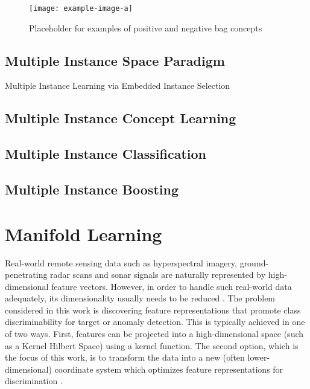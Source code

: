 \begin{center}
	\begin{figure*}[h]
		\centering
		\texttt{[image: example-image-a]}
		\caption[Multiple instance learning bags.]{Placeholder for examples of positive and negative bag concepts}
		\label{fig:bag_eg}
	\end{figure*}
\end{center}

\subsection{Multiple Instance Space Paradigm}
Multiple Instance Learning via Embedded Instance Selection

\subsection{Multiple Instance Concept Learning}

\subsection{Multiple Instance Classification}

\subsection{Multiple Instance Boosting}



\section{Manifold Learning}

Real-world remote sensing data such as hyperspectral imagery, ground-penetrating radar scans and sonar signals are naturally represented by high-dimensional feature vectors.  However, in order to handle such real-world data adequately, its dimensionality usually needs to be reduced \citep{VanDerMaaten2009DRReview,Belkin2004SemiSupLearningRiemannianManifolds}. The problem considered in this work is discovering feature representations that promote class discriminability for target or anomaly detection.  This is typically achieved in one of two ways.  First, features can be projected into a high-dimensional space (such as a Kernel Hilbert Space) using a kernel function. The second option, which is the focus of this work, is to transform the data into a new (often lower-dimensional) coordinate system which optimizes feature representations for discrimination \citep{Vural2018StudySupervisedManifoldLearning}.


